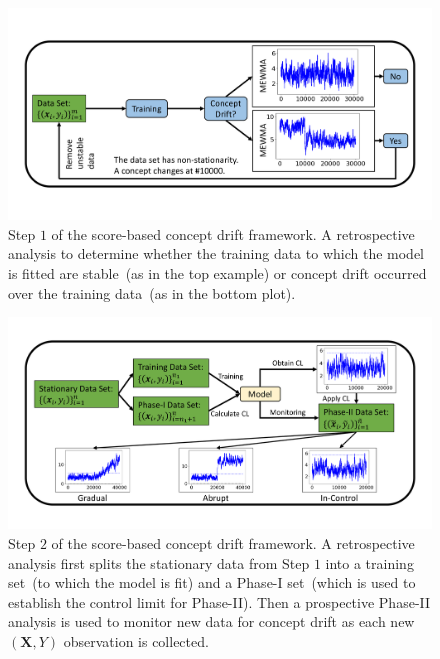 \documentclass[twoside,11pt]{article}
\begin{document}
\begin{figure}[!htbp]
\centering
\includegraphics[width = 1\linewidth, trim=.35in .69in .35in .69in, clip]{../figures/v14/flow_chart/Retrospective_1.png}
\caption{Step $1$ of the score-based concept drift framework. A retrospective analysis to determine whether the training data to which the model is fitted are stable~(as in the top example) or concept drift occurred over the training data~(as in the bottom plot).}
  \label{fig:proc_mon_score_retro}
\end{figure}

\begin{figure}
\centering
\includegraphics[width = 1\linewidth, trim=.35in .49in .35in .49in, clip]{../figures/v14/flow_chart/Monitoring_1.png}
\caption{Step $2$ of the score-based concept drift framework. A retrospective analysis first splits the stationary data from Step $1$ into a training set~(to which the model is fit) and a Phase-I set~(which is used to establish the control limit for Phase-II). Then a prospective Phase-II analysis is used to monitor new data for concept drift as each new $(\bm{X}, Y)$ observation is collected.}
\label{fig:proc_mon_score_monitoring}
\end{figure}
\end{document}
